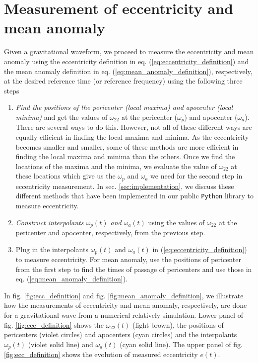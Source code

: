 \documentclass[aps,prd,amsmath,floats,floatfix, twocolumn,
superscriptaddress,nofootinbib,showpacs]{revtex4-1}
\begin{document}
\section{Measurement of eccentricity and mean anomaly}
\label{sec:measurement-of-eccentricity-and-mean-anomaly}
Given a gravitational waveform, we proceed to measure the eccentricity
and mean anomaly using the eccentricity definition in
eq. (\ref{eq:eccentricity_definition}) and the mean anomaly definition
in eq. (\ref{eq:mean_anomaly_definition}), respectively, at the
desired reference time (or reference frequency) using the following
three steps

\begin{enumerate}
\item {\itshape Find the positions of the pericenter (local maxima)
and apocenter (local minima)} and get the values of $\omega_{22}$ at
the pericenter ($\omega_p$) and apocenter ($\omega_a$). There are
several ways to do this. However, not all of these different ways are
equally efficient in finding the local maxima and minima.  As the
eccentricity becomes smaller and smaller, some of these methods are
more efficient in finding the local maxima and minima than the
others. Once we find the locations of the maxima and the minima, we
evaluate the value of $\omega_{22}$ at these locations which give us
the $\omega_p$ and $\omega_a$ we need for the second step in
eccentricity measurement. In sec. \ref{sec:implementation}, we discuss
these different methods that have been implemented in our public
\texttt{Python} library to measure eccentricity.
\item {\itshape Construct interpolants $\omega_p(t)$ and
$\omega_a(t)$} using the values of $\omega_{22}$ at the pericenter and
apocenter, respectively, from the previous step.
\item Plug in the interpolants $\omega_p(t)$ and $\omega_a(t)$ in
(\ref{eq:eccentricity_definition}) to measure eccentricity. For mean
anomaly, use the positions of pericenter from the first step to find
the times of passage of pericenters and use those in
eq. (\ref{eq:mean_anomaly_definition}).
\end{enumerate}

In fig. \ref{fig:ecc_definition} and
fig. \ref{fig:mean_anomaly_definition}, we illustrate how the
measurements of eccentricity and mean anomaly, respectively, are done
for a gravitational wave from a numerical relatively simulation. Lower
panel of fig. \ref{fig:ecc_definition} shows the $\omega_{22}(t)$
(light brown), the positions of pericenters (violet circles) and
apocenters (cyan circles) and the interpolants $\omega_p(t)$ (violet
solid line) and $\omega_a(t)$ (cyan solid line). The upper panel of
fig. \ref{fig:ecc_definition} shows the evolution of measured
eccentricity $e(t)$.
\end{document}

